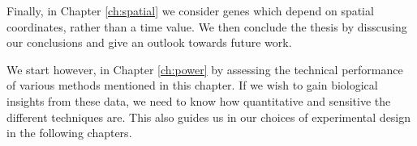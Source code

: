 Finally, in Chapter \ref{ch:spatial} we consider genes which depend on spatial coordinates, rather than a time value. We then conclude the thesis by disscusing our conclusions and give an outlook towards future work.

We start however, in Chapter \ref{ch:power} by assessing the technical performance of various methods mentioned in this chapter. If we wish to gain biological insights from these data, we need to know how quantitative and sensitive the different techniques are. This also guides us in our choices of experimental design in the following chapters.
